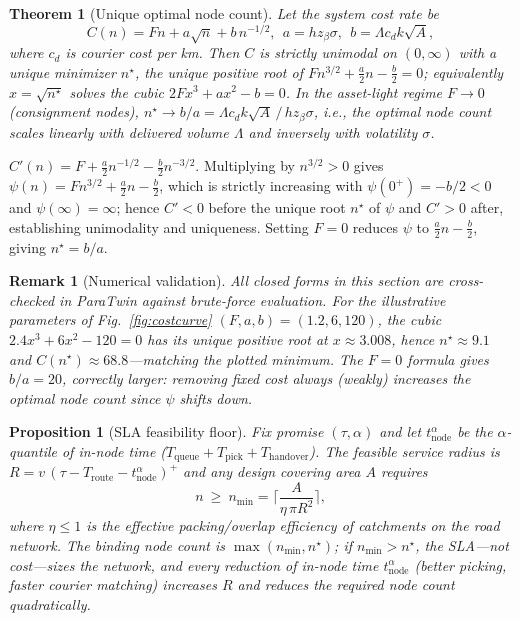 \documentclass[journal]{IEEEtran}
\newtheorem{theorem}{Theorem}
\newtheorem{proposition}{Proposition}
\newtheorem{remark}{Remark}
\begin{document}
\begin{theorem}[Unique optimal node count]
\label{thm:ncost}
Let the system cost rate be
\begin{equation}
\label{eq:cn}
C(n) = F n + a \sqrt{n} + b\, n^{-1/2},\ \ a = h z_\beta \sigma,\ \ b = \Lambda c_d k \sqrt{A},
\end{equation}
where $c_d$ is courier cost per km. Then $C$ is strictly unimodal on $(0,\infty)$ with a unique minimizer $n^\star$, the unique positive root of $F n^{3/2} + \tfrac{a}{2} n - \tfrac{b}{2} = 0$; equivalently $x = \sqrt{n^\star}$ solves the cubic $2F x^{3} + a x^{2} - b = 0$. In the asset-light regime $F \to 0$ (consignment nodes), $n^\star \to b/a = \Lambda c_d k \sqrt{A} \,/\, h z_\beta \sigma$, i.e., the optimal node count scales \emph{linearly} with delivered volume $\Lambda$ and inversely with volatility $\sigma$.
\end{theorem}
\begin{IEEEproof}
$C'(n) = F + \tfrac{a}{2} n^{-1/2} - \tfrac{b}{2} n^{-3/2}$. Multiplying by $n^{3/2} > 0$ gives $\psi(n) = F n^{3/2} + \tfrac{a}{2} n - \tfrac{b}{2}$, which is strictly increasing with $\psi(0^+) = -b/2 < 0$ and $\psi(\infty) = \infty$; hence $C' < 0$ before the unique root $n^\star$ of $\psi$ and $C' > 0$ after, establishing unimodality and uniqueness. Setting $F=0$ reduces $\psi$ to $\tfrac{a}{2} n - \tfrac{b}{2}$, giving $n^\star = b/a$.
\end{IEEEproof}

\begin{remark}[Numerical validation]
\label{rem:numcheck}
All closed forms in this section are cross-checked in ParaTwin against brute-force evaluation. For the illustrative parameters of Fig.~\ref{fig:costcurve} $(F,a,b) = (1.2, 6, 120)$, the cubic $2.4x^3 + 6x^2 - 120 = 0$ has its unique positive root at $x \approx 3.008$, hence $n^\star \approx 9.1$ and $C(n^\star) \approx 68.8$---matching the plotted minimum. The $F=0$ formula gives $b/a = 20$, correctly larger: removing fixed cost always (weakly) increases the optimal node count since $\psi$ shifts down.
\end{remark}

\begin{proposition}[SLA feasibility floor]
\label{prop:floor}
Fix promise $(\tau,\alpha)$ and let $t^{\alpha}_{\mathrm{node}}$ be the $\alpha$-quantile of in-node time ($T_{\mathrm{queue}}+T_{\mathrm{pick}}+T_{\mathrm{handover}}$). The feasible service radius is $R = v\,(\tau - T_{\mathrm{route}} - t^{\alpha}_{\mathrm{node}})^{+}$ and any design covering area $A$ requires
\begin{equation}
\label{eq:floor}
n \ \ge\ n_{\min} = \Big\lceil \frac{A}{\eta\, \pi R^{2}} \Big\rceil,
\end{equation}
where $\eta \le 1$ is the effective packing/overlap efficiency of catchments on the road network. The binding node count is $\max(n_{\min}, n^\star)$; if $n_{\min} > n^\star$, the SLA---not cost---sizes the network, and every reduction of in-node time $t^{\alpha}_{\mathrm{node}}$ (better picking, faster courier matching) increases $R$ and reduces the required node count \emph{quadratically}.
\end{proposition}
\end{document}
